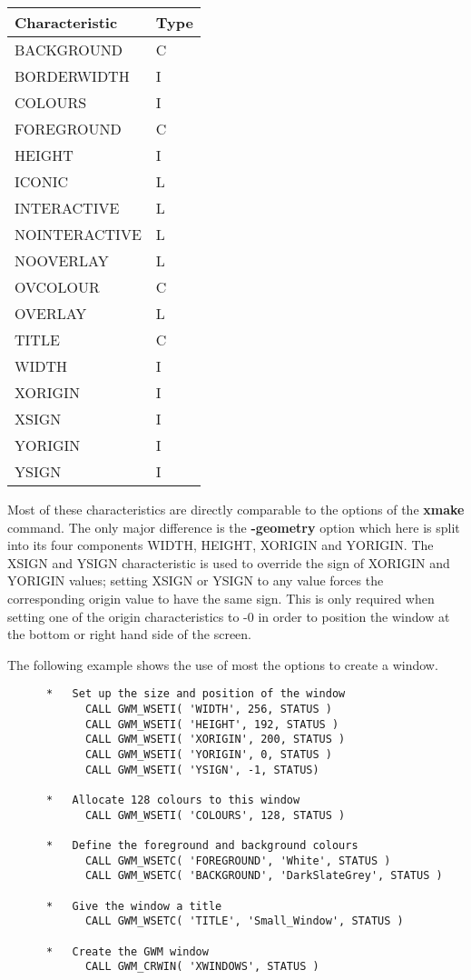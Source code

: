 \begin{center}
\begin{tabular}{|l|l|}   \hline
Characteristic & Type \\ \hline
BACKGROUND     & C    \\
BORDERWIDTH    & I    \\
COLOURS        & I    \\
FOREGROUND     & C    \\
HEIGHT         & I    \\
ICONIC         & L    \\
INTERACTIVE    & L    \\
NOINTERACTIVE  & L    \\
NOOVERLAY      & L    \\
OVCOLOUR       & C    \\
OVERLAY        & L    \\
TITLE          & C    \\ 
WIDTH          & I    \\
XORIGIN        & I    \\
XSIGN          & I    \\
YORIGIN        & I    \\
YSIGN          & I    \\ \hline
\end{tabular}
\end{center}

Most of these characteristics are directly comparable to the options
of the {\bf xmake} command. The only major difference is the {\bf -geometry}
option which here is split into its four components WIDTH, HEIGHT, XORIGIN
and YORIGIN. The XSIGN and YSIGN characteristic is used to override the sign of
XORIGIN and YORIGIN values; setting XSIGN or YSIGN
to any value forces the corresponding origin value to have the same
sign. This is only required when setting one of the
origin characteristics to -0 in order to position the window at the
bottom or right hand side of the screen.

The following example shows the use of most the options to create a window.

\begin{small}
\begin{verbatim}
      *   Set up the size and position of the window
            CALL GWM_WSETI( 'WIDTH', 256, STATUS )
            CALL GWM_WSETI( 'HEIGHT', 192, STATUS )
            CALL GWM_WSETI( 'XORIGIN', 200, STATUS )
            CALL GWM_WSETI( 'YORIGIN', 0, STATUS )
            CALL GWM_WSETI( 'YSIGN', -1, STATUS)

      *   Allocate 128 colours to this window
            CALL GWM_WSETI( 'COLOURS', 128, STATUS )

      *   Define the foreground and background colours
            CALL GWM_WSETC( 'FOREGROUND', 'White', STATUS )
            CALL GWM_WSETC( 'BACKGROUND', 'DarkSlateGrey', STATUS )

      *   Give the window a title
            CALL GWM_WSETC( 'TITLE', 'Small_Window', STATUS )

      *   Create the GWM window
            CALL GWM_CRWIN( 'XWINDOWS', STATUS )
\end{verbatim}
\end{small}

